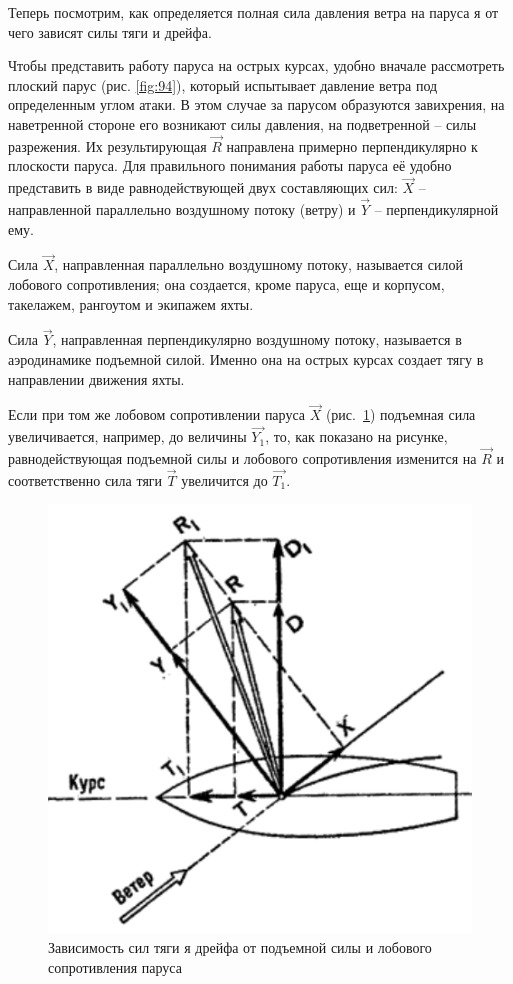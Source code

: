 \documentclass[a4paper, 12pt, twoside, final]{scrbook}
\begin{document}
Теперь посмотрим, как определяется полная сила давления ветра на паруса я от чего зависят силы тяги и дрейфа.

Чтобы представить работу паруса на острых курсах, удобно вначале рассмотреть плоский парус (рис. \ref{fig:94}), который испытывает давление ветра под определенным углом атаки. В этом случае за парусом образуются завихрения, на наветренной стороне его возникают силы давления, на подветренной \--- силы разрежения. Их результирующая $\overrightarrow{R}$ направлена примерно перпендикулярно к плоскости паруса. Для правильного понимания работы паруса её удобно представить в виде равнодействующей двух составляющих сил: $\overrightarrow{X}$ \--- направленной параллельно воздушному потоку (ветру) и $\overrightarrow{Y}$ \--- перпендикулярной ему.

Сила $\overrightarrow{X}$, направленная параллельно воздушному потоку, называется силой лобового сопротивления; она создается, кроме паруса, еще и корпусом, такелажем, рангоутом и экипажем яхты.

Сила $\overrightarrow{Y}$, направленная перпендикулярно воздушному потоку, называется в аэродинамике подъемной силой. Именно она на острых курсах создает тягу в направлении движения яхты.

Если при том же лобовом сопротивлении паруса $\overrightarrow{X}$ (рис.~\ref{fig:95}) подъемная сила увеличивается, например, до величины $\overrightarrow{Y_1}$, то, как показано на рисунке, равнодействующая подъемной силы и лобового сопротивления изменится на $\overrightarrow{R}$ и соответственно сила тяги $\overrightarrow{T}$ увеличится до $\overrightarrow{T_1}$.

\begin{figure}
	\centering
	\includegraphics[scale=1]{95_Zav_sil_tjagi}
	\caption{Зависимость сил тяги я дрейфа от подъемной силы и лобового сопротивления паруса}
	\label{fig:95}
\end{figure}
\end{document}

